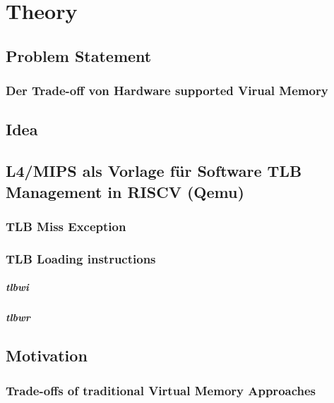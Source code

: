 \chapter{Theory}

\label{chap:theory}

\section{Problem Statement}
\subsection{Der Trade-off von Hardware supported Virual Memory} %
\section{Idea}
\section{L4/MIPS als Vorlage für Software TLB Management in RISCV (Qemu)}
\subsection{TLB Miss Exception}
\subsection{TLB Loading instructions}
\paragraph{tlbwi}
\paragraph{tlbwr}
\section{Motivation}
\subsection{Trade-offs of traditional Virtual Memory Approaches}




